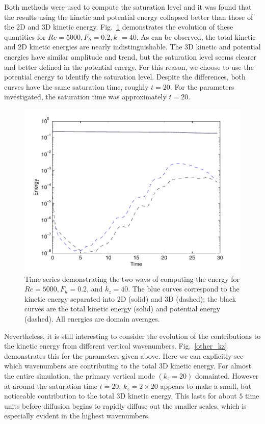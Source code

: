 Both methods were used to compute the saturation level and it was found that the results using the kinetic and potential energy collapsed better than those of the 2D and 3D kinetic energy. Fig.~\ref{sat_energy} demonstrates the evolution of these quantities for $Re=5000, F_{h}=0.2, k_{z}=40$. As can be observed, the total kinetic and 2D kinetic energies are nearly indistinguishable. The 3D kinetic and potential energies have similar amplitude and trend, but the saturation level seems clearer and better defined in the potential energy. For this reason, we choose to use the potential energy to identify the saturation level. Despite the differences, both curves have the same saturation time, roughly $t=20$. For the parameters investigated, the saturation time was approximately $t=20$. 
\begin{figure}
\begin{center}
\includegraphics[width=\textwidth]{sat_eg_re5000_fh02}
\caption{Time series demonstrating the two ways of computing the energy for $Re=5000, F_{h}=0.2$, and $k_{z}=40$. The blue curves correspond to the kinetic energy separated into 2D (solid) and 3D (dashed); the black curves are the total kinetic energy (solid) and potential energy (dashed). All energies are domain averages.}
\label{sat_energy}
\end{center}
\end{figure}
Nevertheless, it is still interesting to consider the evolution of the contributions to the kinetic energy from different vertical wavenumbers. Fig.~\ref{other_kz} demonstrates this for the parameters given above. Here we can explicitly see which wavenumbers are contributing to the total 3D kinetic energy. For almost the entire simulation, the primary vertical mode $(k_{z}=20)$ domainted. However at around the saturation time $t=20$, $k_{z}=2\times 20$ appears to make a small, but noticeable contribution to the total 3D kinetic energy. This lasts for about $5$ time units before diffusion begins to rapidly diffuse out the smaller scales, which is especially evident in the highest wavenumbers. 
